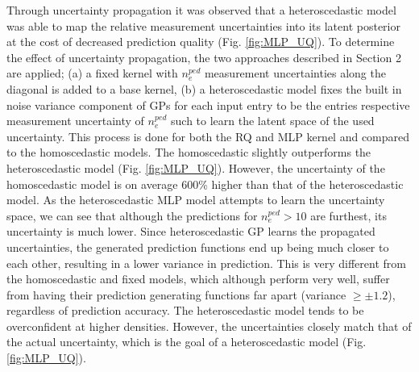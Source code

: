 \documentclass[a4paper, twoside, final, 12pt]{article}
\begin{document}
{Through uncertainty propagation it was observed that a heteroscedastic model was able to map the relative measurement uncertainties into its latent posterior at the cost of decreased prediction quality (Fig.  \ref{fig:MLP_UQ}). 
To determine the effect of uncertainty propagation, the two approaches described in Section 2 are applied; (a) a fixed kernel with $n_e^{ped}$ measurement uncertainties along the diagonal is added to a base kernel, (b) a heteroscedastic model fixes the built in noise variance component of GPs for each input entry to be the entries respective measurement uncertainty of $n_e^{ped}$ such to learn the latent space of the used uncertainty. This process is done for both the RQ and MLP kernel and compared to the homoscedastic models.
The homoscedastic slightly outperforms the heteroscedastic model (Fig. \ref{fig:MLP_UQ}). However, the uncertainty of the homoscedastic model is on average 600\% higher than that of the heteroscedastic model. As the heteroscedastic MLP model attempts to learn the uncertainty space, we can see that although the predictions for $n_e^{ped} > 10$ are furthest, its uncertainty is much lower. Since heteroscedastic GP learns the propagated uncertainties, the generated prediction functions end up being much closer to each other, resulting in a lower variance in prediction. This is very different from the homoscedastic and fixed models, which although perform very well, suffer from having their prediction generating functions far apart (variance $ \geq \pm 1.2$), regardless of prediction accuracy. The heteroscedastic model tends to be overconfident at higher densities. However, the uncertainties closely match that of the actual uncertainty, which is the goal of a heteroscedastic model (Fig. \ref{fig:MLP_UQ}). 

}
\end{document}
